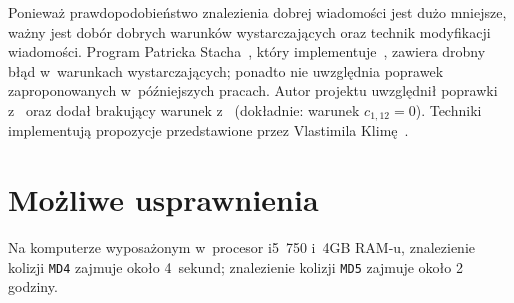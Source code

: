 \documentclass[12pt,a4paper,twoside]{article}
\begin{document}
Ponieważ prawdopodobieństwo znalezienia dobrej wiadomości jest dużo mniejsze,
ważny jest dobór dobrych warunków wystarczających oraz technik modyfikacji
wiadomości. Program Patricka Stacha~\cite{stach2005md5}, który
implementuje~\cite{wang2005md5}, zawiera drobny błąd w~warunkach
wystarczających; ponadto nie uwzględnia poprawek zaproponowanych w~późniejszych
pracach. Autor projektu uwzględnił poprawki
z~\cite{yajima2005wang,sasaki2005improved,liang2007improved} oraz dodał
brakujący warunek z~\cite{wang2005md5} (dokładnie: warunek $c_{1,12} = 0$).
Techniki  implementują propozycje
przedstawione przez Vlastimila Klimę~\cite{klima2005finding2}.

\section{Możliwe usprawnienia}

Na komputerze wyposażonym w~procesor i5~750 i~4GB RAM-u, znalezienie kolizji
\texttt{MD4} zajmuje około 4~sekund; znalezienie kolizji
\texttt{MD5} zajmuje około 2 godziny. 

\newpage


\end{document}
